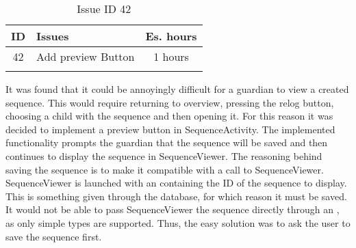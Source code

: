 \begin{longtable} { | c | p{12cm} | c | } 
\hline
	ID 	&	Issues	&		 Es. hours \\\hline
	42	&	Add preview Button	&	1 hours	\\\hline
\caption{Issue ID 42}
\label{tab:spr4_previewButton}
\end{longtable}

It was found that it could be annoyingly difficult for a guardian to view a created sequence. This would require returning to overview, pressing the relog button, choosing a child with the sequence and then opening it. For this reason it was decided to implement a preview button in SequenceActivity. The implemented functionality prompts the guardian that the sequence will be saved and then continues to display the sequence in SequenceViewer. The reasoning behind saving the sequence is to make it compatible with a call to SequenceViewer. SequenceViewer is launched with an  containing the ID of the sequence to display. This is something given through the database, for which reason it must be saved. It would not be able to pass SequenceViewer the sequence directly through an , as only simple types are supported. Thus, the easy solution was to ask the user to save the sequence first.